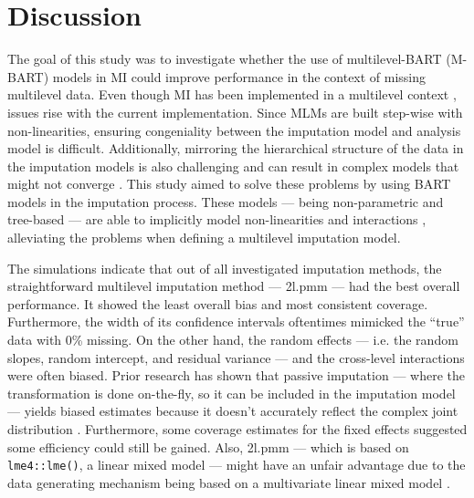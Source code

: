 \documentclass[3p,12pt,a4paper]{elsarticle}
\begin{document}
\section{Discussion}
The goal of this study was to investigate whether the use of multilevel-BART (M-BART) models in MI could improve performance in the context of missing multilevel data. Even though MI has been implemented in a multilevel context \citep{mistlerComparisonJointModel2017, enders2018, enders2018a, enders2020, buurenFlexibleImputationMissing2018, taljaard2008, enders2016, resche-rigon2018, audigier2018, dong2023, grund2016, grund2018a, grund2018, ludtke2017, grund2021, quartagno2022}, issues rise with the current implementation. Since MLMs are built step-wise with non-linearities, ensuring congeniality between the imputation model and analysis model is difficult. Additionally, mirroring the hierarchical structure of the data in the imputation models is also challenging \citep{buurenFlexibleImputationMissing2018, burgette2010, hox2011} and can result in complex models that might not converge \citep{buurenFlexibleImputationMissing2018}. This study aimed to solve these problems by using BART models in the imputation process. These models --- being non-parametric and tree-based --- are able to implicitly model non-linearities and interactions \citep{hill2020, burgette2010, lin2019, chipman2010, james2021, salditt2023, breiman1984}, alleviating the problems when defining a multilevel imputation model. 

The simulations indicate that out of all investigated imputation methods, the straightforward multilevel imputation method --- 2l.pmm --- had the best overall performance. It showed the least overall bias and most consistent coverage. Furthermore, the width of its confidence intervals oftentimes mimicked the ``true'' data with 0\% missing. On the other hand, the random effects --- i.e. the random slopes, random intercept, and residual variance --- and the cross-level interactions were often biased. Prior research has shown that passive imputation --- where the transformation is done on-the-fly, so it can be included in the imputation model --- yields biased estimates because it doesn't accurately reflect the complex joint distribution \citep{grund2018,vink2013,seaman2012}. Furthermore, some coverage estimates for the fixed effects suggested some efficiency could still be gained. Also, 2l.pmm --- which is based on \texttt{lme4::lme()}, a linear mixed model --- might have an unfair advantage due to the data generating mechanism being based on a multivariate linear mixed model \citep{oberman2023}. %
\end{document}
